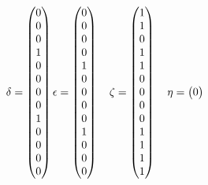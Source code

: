 \documentclass{article}
\begin{document}
\begin{center}
\begin{equation*}
\delta=\begin{pmatrix}
            0 \\
            0 \\
            0 \\
            1 \\
            0 \\
            0 \\
            0 \\
            0 \\
            1 \\
            0 \\
            0 \\
            0 \\
            0 
\end{pmatrix} \\
\epsilon=\begin{pmatrix}
            0 \\
            0 \\
            0 \\
            0 \\
            1 \\
            0 \\
            0 \\
            0 \\
            0 \\
            1 \\
            0 \\
            0 \\
            0
\end{pmatrix} \quad
\zeta=\begin{pmatrix}
            1 \\
            1 \\
            0 \\
            1 \\
            1 \\
            0 \\
            0 \\
            0 \\
            0 \\
            1 \\
            1 \\
            1 \\
            1
\end{pmatrix} \quad
\eta=\begin{pmatrix}
            0 \\

\end{pmatrix}
\end{equation*}
\end{center}
\end{document}
